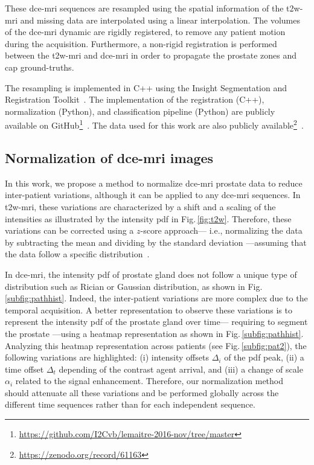 These \ac{dce}-\ac{mri} sequences are resampled using the spatial information of the \ac{t2w}-\ac{mri} and missing data are interpolated using a linear interpolation.
The volumes of the \ac{dce}-\ac{mri} dynamic are rigidly registered, to remove any patient motion during the acquisition.
Furthermore, a non-rigid registration is performed between the \ac{t2w}-\ac{mri} and \ac{dce}-\ac{mri} in order to propagate the prostate zones and \ac{cap} ground-truths.

The resampling is implemented in C++ using the Insight Segmentation and Registration Toolkit~\citep{ibanez2005itk}.
The implementation of the registration (C++), normalization (Python), and classification pipeline (Python) are publicly available on GitHub\footnote{\url{https://github.com/I2Cvb/lemaitre-2016-nov/tree/master}}~\citep{lemaitre2016github}.
The data used for this work are also publicly available\footnote{\url{https://zenodo.org/record/61163}}~\citep{lemaitre2016dce}.


\subsection{Normalization of \ac{dce}-\ac{mri} images}\label{sec:norm}

In this work, we propose a method to normalize \ac{dce}-\ac{mri} prostate data to reduce inter-patient variations, although it can be applied to any \ac{dce}-\ac{mri} sequences.
In \ac{t2w}-\ac{mri}, these variations are characterized by a shift and a scaling of the intensities as illustrated by the intensity \ac{pdf} in Fig.\,\ref{fig:t2w}.
Therefore, these variations can be corrected using a $z$-score approach--- i.e., normalizing the data by subtracting the mean and dividing by the standard deviation ---assuming that the data follow a specific distribution~\citep{lemaitre2016normalization}.

In \ac{dce}-\ac{mri}, the intensity \ac{pdf} of prostate gland does not follow a unique type of distribution such as Rician or Gaussian distribution, as shown in Fig.\,\ref{subfig:pathhist}.
Indeed, the inter-patient variations are more complex due to the temporal acquisition.
A better representation to observe these variations is to represent the intensity \ac{pdf} of the prostate gland over time--- requiring to segment the prostate ---using a heatmap representation as shown in Fig.\,\ref{subfig:pathhist}.
Analyzing this heatmap representation across patients (see Fig.\,\ref{subfig:pat2}), the following variations are highlighted:
(i) intensity offsets $\Delta_i$ of the \ac{pdf} peak,
(ii) a time offset $\Delta_t$ depending of the contrast agent arrival, and
(iii) a change of scale $\alpha_i$ related to the signal enhancement.
Therefore, our normalization method should attenuate all these variations and be performed globally across the different time sequences rather than for each independent sequence.


